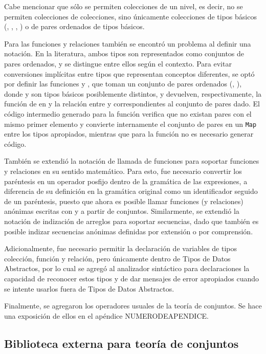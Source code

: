 {{Cabe mencionar que sólo se permiten colecciones de un nivel, es decir, no se
permiten colecciones de colecciones, sino únicamente colecciones de tipos
básicos (, , , ) o de pares
ordenados de tipos básicos.

Para las funciones y relaciones también se encontró un problema al definir una
notación. En la literatura, ambos tipos son representados como conjuntos de
pares ordenados, y se distingue entre ellos según el contexto. Para evitar
conversiones implícitas entre tipos que representan conceptos diferentes, se
optó por definir las funciones  y , que toman un conjunto
de pares ordenados (, ), donde  y  son tipos
básicos posiblemente distintos, y devuelven, respectivamente, la función de
 en  y la relación entre  y 
correspondientes al conjunto de pares dado. El código intermedio generado para
la función  verifica que no existan pares con el mismo primer
elemento y convierte internamente el conjunto de pares en un \texttt{Map}
 entre los tipos apropiados, mientras que para la función 
no es necesario generar código.

También se extendió la notación de llamada de funciones para soportar funciones
y relaciones en su sentido matemático. Para esto, fue necesario convertir los
paréntesis en un operador posfijo dentro de la gramática de las expresiones, a
diferencia de su definición en la gramática original como un identificador
seguido de un paréntesis, puesto que ahora es posible llamar funciones (y
relaciones) anónimas escritas con  y  a partir de
conjuntos. Similarmente, se extendió la notación de indización de arreglos para
soportar secuencias, dado que también es posible indizar secuencias anónimas
definidas por extensión o por comprensión.

Adicionalmente, fue necesario permitir la declaración de variables de tipos
colección, función y relación, pero únicamente dentro de Tipos de Datos
Abstractos, por lo cual se agregó al analizador sintáctico para declaraciones la
capacidad de reconocer estos tipos y de dar mensajes de error apropiados cuando
se intente usarlos fuera de Tipos de Datos Abstractos.

Finalmente, se agregaron los operadores usuales de la teoría de conjuntos. Se
hace una exposición de ellos en el apéndice NUMERODEAPENDICE.

\subsection{Biblioteca externa para teoría de conjuntos}

}}
